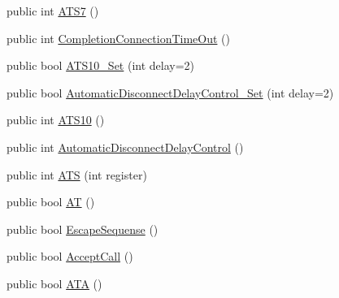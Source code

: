 \begin{DoxyCompactItemize}
\item 
public int \hyperlink{classedwinspire_1_1Ports_1_1Modem_aaadd01f28f9dda5c9d92fdc8730b2de1}{A\-T\-S7} ()
\item 
public int \hyperlink{classedwinspire_1_1Ports_1_1Modem_ad361341f56d187f035adb4c73102c9c3}{Completion\-Connection\-Time\-Out} ()
\item 
public bool \hyperlink{classedwinspire_1_1Ports_1_1Modem_a37640913ae0ad1fc261825ed88215bce}{A\-T\-S10\-\_\-\-Set} (int delay=2)
\item 
public bool \hyperlink{classedwinspire_1_1Ports_1_1Modem_a8f6139f59aae77cad6d36f18731470c7}{Automatic\-Disconnect\-Delay\-Control\-\_\-\-Set} (int delay=2)
\item 
public int \hyperlink{classedwinspire_1_1Ports_1_1Modem_a1aefb4dfe1bcecc8b0b59009ea0c7fce}{A\-T\-S10} ()
\item 
public int \hyperlink{classedwinspire_1_1Ports_1_1Modem_a5e7d76433531d2895eb66812f1119fb4}{Automatic\-Disconnect\-Delay\-Control} ()
\item 
public int \hyperlink{classedwinspire_1_1Ports_1_1Modem_a068e0e35be6a4342a2c6e36313a2246d}{A\-T\-S} (int register)
\item 
public bool \hyperlink{classedwinspire_1_1Ports_1_1Modem_aea47101eee0211d0ba1a328fcbfe28c9}{A\-T} ()
\item 
public bool \hyperlink{classedwinspire_1_1Ports_1_1Modem_a6a90de46a4810fcdf056e44f1f7dd27a}{Escape\-Sequense} ()
\item 
public bool \hyperlink{classedwinspire_1_1Ports_1_1Modem_a1f6ca76e1284927f315c528c96854af6}{Accept\-Call} ()
\item 
public bool \hyperlink{classedwinspire_1_1Ports_1_1Modem_acf0e76263adc9ee3b8b1eed05f1a34a8}{A\-T\-A} ()
\end{DoxyCompactItemize}

